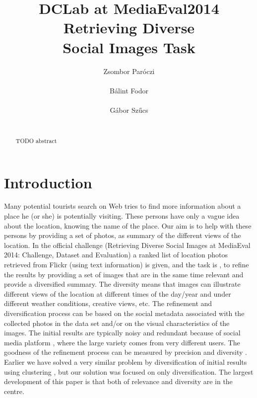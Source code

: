 \documentclass{acm_proc_article-me}
\begin{document}

\title{DCLab at MediaEval2014 Retrieving Diverse \\ Social Images Task}


\author{
\alignauthor
Zsombor Par\'oczi\\
       \\
\alignauthor
B\'alint Fodor\\
       \\
\alignauthor
G\'abor Sz\H ucs \\
       \\
}

\maketitle
\begin{abstract}
TODO abstract
\end{abstract}

\section{Introduction}

Many potential tourists search on Web tries to find more information about a place he (or she) is potentially visiting. These persons have only a vague idea about the location, knowing the name of the place. Our aim is to help with these persons by providing a set of photos, as summary of the different views of the location. 
In the official challenge (Retrieving Diverse Social Images at MediaEval 2014: Challenge, Dataset and Evaluation) \cite{ionescu2014retrieving} a ranked list of location photos retrieved from Flickr (using text information) is given, and the task is , to refine the results by providing a set of images that are in the same time relevant and provide a diversified summary. The diversity means that images can illustrate different views of the location at different times of the day/year and under different weather conditions, creative views, etc. The refinement and diversification process can be based on the social metadata associated with the collected photos in the data set \cite{ionescu2014div400} and/or on the visual characteristics of the images. The initial results are typically noisy and redundant because of social media platform \cite{radu2014hybrid}, where the large variety comes from very different users. 
The goodness of the refinement process can be measured by precision and diversity \cite{Taneva:2010:GRP:1718487.1718541}. Earlier we have solved a very similar problem by diversification of initial results using clustering \cite{szHucs2013bmemtm}, but our solution was focused on only diversification. The largest development of this paper is that both of relevance and diversity are in the centre.
\end{document}
